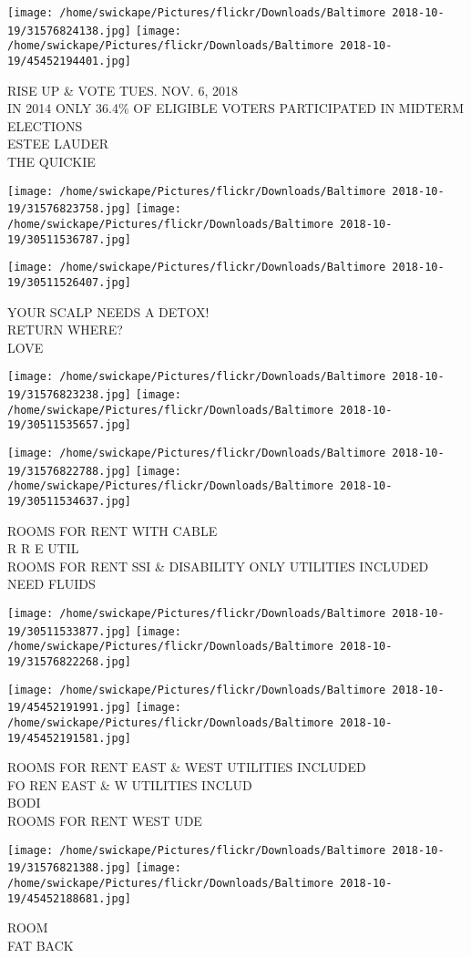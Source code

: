 \documentclass[10pt,letterpaper]{article}
\begin{document}
\texttt{[image: /home/swickape/Pictures/flickr/Downloads/Baltimore 2018-10-19/31576824138.jpg]}
\texttt{[image: /home/swickape/Pictures/flickr/Downloads/Baltimore 2018-10-19/45452194401.jpg]}

RISE UP \& VOTE TUES. NOV. 6, 2018\\
IN 2014 ONLY 36.4\% OF ELIGIBLE VOTERS PARTICIPATED IN MIDTERM ELECTIONS\\
ESTEE LAUDER\\
THE QUICKIE
\pagebreak

\texttt{[image: /home/swickape/Pictures/flickr/Downloads/Baltimore 2018-10-19/31576823758.jpg]}
\texttt{[image: /home/swickape/Pictures/flickr/Downloads/Baltimore 2018-10-19/30511536787.jpg]}

\vspace{0.25in}
\texttt{[image: /home/swickape/Pictures/flickr/Downloads/Baltimore 2018-10-19/30511526407.jpg]}

YOUR SCALP NEEDS A DETOX!\\
RETURN WHERE?\\
LOVE
\pagebreak

\texttt{[image: /home/swickape/Pictures/flickr/Downloads/Baltimore 2018-10-19/31576823238.jpg]}
\texttt{[image: /home/swickape/Pictures/flickr/Downloads/Baltimore 2018-10-19/30511535657.jpg]}

\texttt{[image: /home/swickape/Pictures/flickr/Downloads/Baltimore 2018-10-19/31576822788.jpg]}
\texttt{[image: /home/swickape/Pictures/flickr/Downloads/Baltimore 2018-10-19/30511534637.jpg]}

ROOMS FOR RENT WITH CABLE\\
R R E UTIL\\
ROOMS FOR RENT SSI \& DISABILITY ONLY UTILITIES INCLUDED\\
NEED FLUIDS
\pagebreak

\texttt{[image: /home/swickape/Pictures/flickr/Downloads/Baltimore 2018-10-19/30511533877.jpg]}
\texttt{[image: /home/swickape/Pictures/flickr/Downloads/Baltimore 2018-10-19/31576822268.jpg]}

\texttt{[image: /home/swickape/Pictures/flickr/Downloads/Baltimore 2018-10-19/45452191991.jpg]}
\texttt{[image: /home/swickape/Pictures/flickr/Downloads/Baltimore 2018-10-19/45452191581.jpg]}

ROOMS FOR RENT EAST \& WEST UTILITIES INCLUDED\\
FO REN EAST \& W UTILITIES INCLUD\\
BODI\\
ROOMS FOR RENT WEST UDE
\pagebreak

\texttt{[image: /home/swickape/Pictures/flickr/Downloads/Baltimore 2018-10-19/31576821388.jpg]}
\texttt{[image: /home/swickape/Pictures/flickr/Downloads/Baltimore 2018-10-19/45452188681.jpg]}

ROOM\\
FAT BACK
\pagebreak
\end{document}
